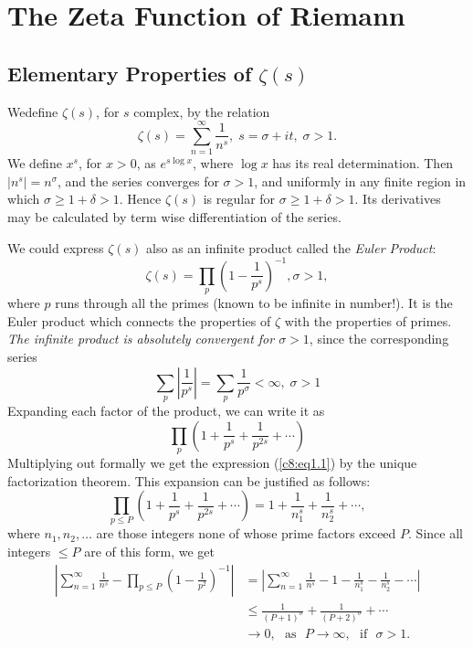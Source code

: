 \chapter{The Zeta Function of Riemann}\label{chap8}

\section[Elementary Properties of $\zeta(s)$]{Elementary Properties of {\boldmath$\zeta(s)$} \cite[pp.1-9]{key16}}\label{chap8:sec1}

We\pageoriginale define $\zeta(s)$, for $s$ complex, by the relation
\begin{equation*}
\zeta(s) = \sum\limits^\infty_{n=1} \frac{1}{n^s}, \; s = \sigma + i
t, \; \sigma >1. \tag{1.1}\label{c8:eq1.1}
\end{equation*}
We define $x^s$, for $x>0$, as $e^{s \log x}$, where $\log x$ has its
real determination. Then $|n^s|=n^\sigma$, and the series converges
for $\sigma > 1$, and uniformly in any finite region in which $\sigma
\geq 1 + \delta >1$. Hence $\zeta(s)$ is regular for $\sigma \geq 1+
\delta >1$. Its derivatives may be calculated by term wise
differentiation of the series.

We could express $\zeta(s)$ also as an infinite product called the
\textit{Euler Product}:
\begin{equation*}
\zeta(s) = \prod\limits_p \left(1 - \frac{1}{p^s}\right)^{-1}, \sigma
>1,  \tag{1.2}\label{c8:eq1.2}
\end{equation*}
where $p$ runs through all the primes (known to be infinite in
number!). It is the Euler product which connects the properties of
$\zeta$ with the properties of primes. \textit{The infinite product is
absolutely convergent for $\sigma >1$}, since the corresponding series 
$$
\sum\limits_p \left| \frac{1}{p^s}\right| = \sum\limits_p
\frac{1}{p^\sigma} < \infty, \; \sigma >1
$$
Expanding each factor of the product, we can write it as 
$$
\prod\limits_p \left(1+\frac{1}{p^s} + \frac{1}{p^{2s}} + \cdots
\right) 
$$\pageoriginale
Multiplying out formally we get the expression (\ref{c8:eq1.1}) by the unique
factorization theorem. This expansion can be justified as follows:
$$
\prod\limits_{p\leq P} \left(1+\frac{1}{p^s} + \frac{1}{p^{2s}} +
\cdots \right)  = 1 + \frac{1}{n^s_1} + \frac{1}{n_2^s} + \cdots,
$$
where $n_1, n_2, \ldots$ are those integers none of whose prime
factors exceed $P$. Since all integers $\leq P$ are of this form, we
get
\begin{align*}
\left|\sum\limits^\infty_{n=1} \frac{1}{n^s} - \prod\limits_{p\leq P}
\left(1 - \frac{1}{p^2} \right)^{-1} \right| & =
\left|\sum\limits^\infty_{n=1} \frac{1}{n^s} -1 - \frac{1}{n^s_1} -
\frac{1}{n^s_2} - \cdots\right| \\
& \leq \frac{1}{(P+1)^{\sigma}} + \frac{1}{(P+2)^{\sigma}} + \cdots\\
& \to 0, \text{~ as~ } P\to \infty, \text{~ if~ } \sigma >1.
\end{align*}


